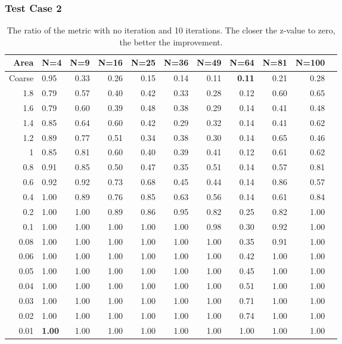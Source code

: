 \documentclass[]{beamer}
\begin{document}
\begin{frame}[t]\frametitle{Test Case 2}
\begin{table}[H]
\centering
\tiny
\caption{The ratio  of the metric with no iteration and 10 iterations. The closer the z-value to zero, the better the improvement.} 
\begin{tabular}{rlrrrrrrrrr}
  \hline
  Area & N=4 & N=9 & N=16 & N=25 & N=36 & N=49 & N=64 & N=81 & N=100 \\ 
  \hline
Coarse & 0.95 & 0.33 & 0.26 & 0.15 & 0.14 & 0.11 & \textbf{\cellcolor{blue!25}0.11} & 0.21 & 0.28 \\ 
  1.8 & 0.79 & 0.57 & 0.40 & 0.42 & 0.33 & 0.28 & 0.12 & 0.60 & 0.65 \\ 
1.6 & 0.79 & 0.60 & 0.39 & 0.48 & 0.38 & 0.29 & 0.14 & 0.41 & 0.48 \\ 
 1.4 & 0.85 & 0.64 & 0.60 & 0.42 & 0.29 & 0.32 & 0.14 & 0.41 & 0.62 \\ 
 1.2 & 0.89 & 0.77 & 0.51 & 0.34 & 0.38 & 0.30 & 0.14 & 0.65 & 0.46 \\ 
 1 & 0.85 & 0.81 & 0.60 & 0.40 & 0.39 & 0.41 & 0.12 & 0.61 & 0.62 \\ 
  0.8 & 0.91 & 0.85 & 0.50 & 0.47 & 0.35 & 0.51 & 0.14 & 0.57 & 0.81 \\ 
 0.6 & 0.92 & 0.92 & 0.73 & 0.68 & 0.45 & 0.44 & 0.14 & 0.86 & 0.57 \\ 
 0.4 & 1.00 & 0.89 & 0.76 & 0.85 & 0.63 & 0.56 & 0.14 & 0.61 & 0.84 \\ 
   0.2 & 1.00 & 1.00 & 0.89 & 0.86 & 0.95 & 0.82 & 0.25 & 0.82 & 1.00 \\ 
   0.1 & 1.00 & 1.00 & 1.00 & 1.00 & 1.00 & 0.98 & 0.30 & 0.92 & 1.00 \\ 
 0.08 & 1.00 & 1.00 & 1.00 & 1.00 & 1.00 & 1.00 & 0.35 & 0.91 & 1.00 \\ 
 0.06 & 1.00 & 1.00 & 1.00 & 1.00 & 1.00 & 1.00 & 0.42 & 1.00 & 1.00 \\ 
   0.05 & 1.00 & 1.00 & 1.00 & 1.00 & 1.00 & 1.00 & 0.45 & 1.00 & 1.00 \\ 
   0.04 & 1.00 & 1.00 & 1.00 & 1.00 & 1.00 & 1.00 & 0.51 & 1.00 & 1.00 \\ 
   0.03 & 1.00 & 1.00 & 1.00 & 1.00 & 1.00 & 1.00 & 0.71 & 1.00 & 1.00 \\ 
   0.02 & 1.00 & 1.00 & 1.00 & 1.00 & 1.00 & 1.00 & 0.74 & 1.00 & 1.00 \\ 
 0.01 & \textbf{\cellcolor{blue!25}1.00} & 1.00 & 1.00 & 1.00 & 1.00 & 1.00 & 1.00 & 1.00 & 1.00 \\ 
   \hline
\end{tabular}
\end{table}
\end{frame}
\end{document}
